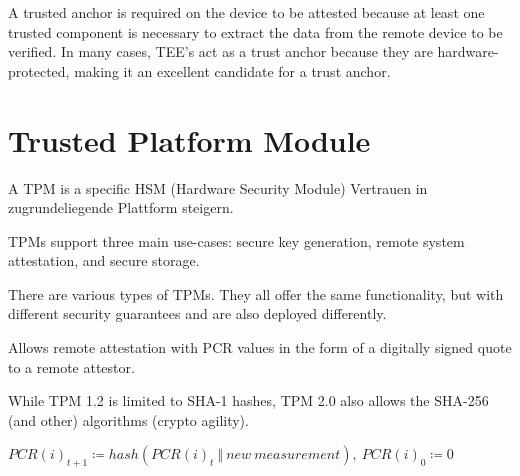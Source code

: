 A trusted anchor is required on the device to be attested because at least one trusted component is necessary to extract the data from the remote device to be verified. In many cases, TEE's act as a trust anchor because they are hardware-protected, making it an excellent candidate for a trust anchor.

\section{Trusted Platform Module}

A TPM is a specific HSM (Hardware Security Module)
Vertrauen in zugrundeliegende Plattform steigern.

TPMs support three main use-cases: secure key generation, remote system attestation, and secure storage. 

There are various types of TPMs. They all offer the same functionality, but with different security guarantees and are also deployed differently.

Allows remote attestation with PCR values in the form of a digitally signed quote to a remote attestor.


While TPM 1.2 is limited to SHA-1 hashes, TPM 2.0 also allows the SHA-256 (and other) algorithms (crypto agility).


$PCR(i)_{t+1} \coloneqq hash(PCR(i)_t\ \Vert\ new\ measurement),\ PCR(i)_0 \coloneqq 0$

